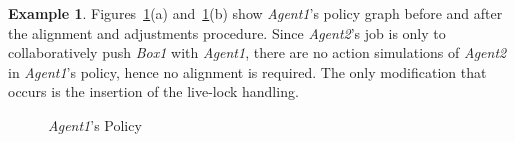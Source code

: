 \documentclass[letterpaper]{article} %
\theoremstyle{definition}
\newtheorem{example}{Example}
\begin{document}
\begin{example}
Figures~\ref{Fig:Alignment}(a) and~\ref{Fig:Alignment}(b) show \emph{Agent1}'s policy graph before and after the alignment and adjustments procedure.
Since \emph{Agent2}'s job is only to collaboratively push \emph{Box1} with \emph{Agent1}, there are no action simulations of \emph{Agent2} in \emph{Agent1}'s policy, hence no alignment is required. The only modification that occurs is the insertion of the live-lock handling.


\begin{figure}
    \centering
      \hfill
\caption{\label{Fig:Alignment} \emph{Agent1}'s Policy}
\end{figure}
\end{example}
\end{document}
